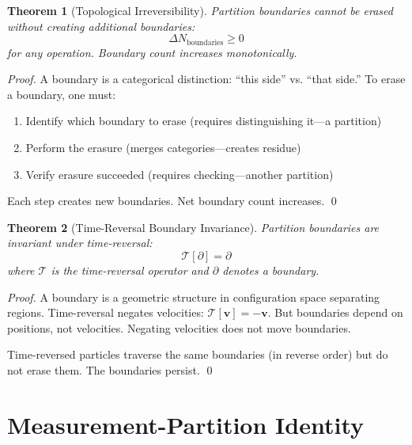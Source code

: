 \documentclass[twocolumn,10pt]{article}
\newtheorem{theorem}{Theorem}[section]
\theoremstyle{definition}
\theoremstyle{remark}
\begin{document}
\begin{theorem}[Topological Irreversibility]
\label{thm:topological}
Partition boundaries cannot be erased without creating additional boundaries:
\begin{equation}
\Delta N_{\text{boundaries}} \geq 0
\end{equation}
for any operation. Boundary count increases monotonically.
\end{theorem}

\begin{proof}
A boundary is a categorical distinction: ``this side'' vs. ``that side.'' To erase a boundary, one must:
\begin{enumerate}
\item Identify which boundary to erase (requires distinguishing it---a partition)
\item Perform the erasure (merges categories---creates residue)
\item Verify erasure succeeded (requires checking---another partition)
\end{enumerate}

Each step creates new boundaries. Net boundary count increases. \qed
\end{proof}

\begin{theorem}[Time-Reversal Boundary Invariance]
\label{thm:time_reversal}
Partition boundaries are invariant under time-reversal:
\begin{equation}
\mathcal{T}[\partial] = \partial
\end{equation}
where $\mathcal{T}$ is the time-reversal operator and $\partial$ denotes a boundary.
\end{theorem}

\begin{proof}
A boundary is a geometric structure in configuration space separating regions. Time-reversal negates velocities: $\mathcal{T}[\mathbf{v}] = -\mathbf{v}$. But boundaries depend on positions, not velocities. Negating velocities does not move boundaries.

Time-reversed particles traverse the same boundaries (in reverse order) but do not erase them. The boundaries persist. \qed
\end{proof}

\section{Measurement-Partition Identity}
\label{sec:measurement}
\end{document}
